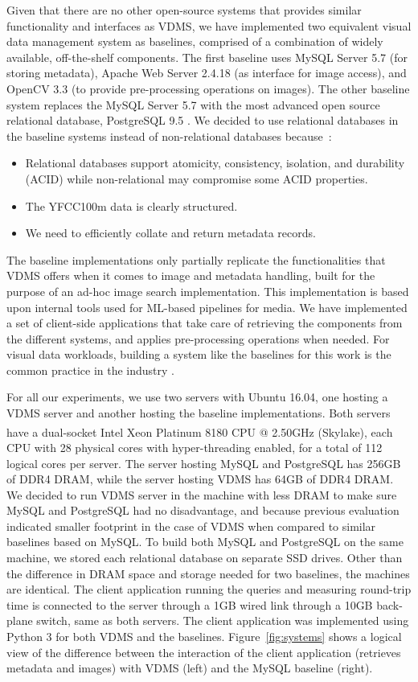Given that there are no other open-source systems
that provides similar functionality and interfaces as VDMS,
we have implemented two equivalent visual data management system as baselines,
comprised of a combination of widely available, off-the-shelf components.
The first baseline uses
MySQL Server 5.7 (for storing metadata),
Apache Web Server 2.4.18 (as interface for image access), and
OpenCV 3.3 (to provide pre-processing operations on images).
The other baseline system replaces the MySQL Server 5.7 with the
most advanced open source relational database, PostgreSQL 9.5 \cite{postgresql}.
We decided to use relational databases in the baseline systems instead of non-relational
databases because~\cite{Jatana2012, li_2019}:
\begin{itemize}
    \item Relational databases support atomicity, consistency, isolation,
    and durability (ACID) while non-relational may compromise some ACID properties.
    \item The YFCC100m data is clearly structured.
    \item We need to efficiently collate and return metadata records.
\end{itemize}
The baseline implementations only partially replicate the functionalities
that VDMS offers when it comes to image and metadata handling, built for the
purpose of an ad-hoc image search implementation.
This implementation is based upon internal tools used for
ML-based pipelines for media.
We have implemented a set of client-side applications that take care
of retrieving the components from the different systems, and applies
pre-processing operations when needed.
For visual data workloads, building a system like the baselines for this work
is the common practice in the industry \cite{haystack, tao}.

For all our experiments, we use two servers with Ubuntu 16.04, one hosting a VDMS server and
another hosting the baseline implementations.
Both servers have a dual-socket Intel\textsuperscript{\textregistered}
Xeon\textsuperscript{\textregistered} Platinum 8180 CPU @ 2.50GHz (Skylake),
each CPU with 28 physical cores with hyper-threading enabled,
for a total of 112 logical cores per server.
The server hosting MySQL and PostgreSQL has 256GB of DDR4 DRAM, while the server hosting VDMS
has 64GB of DDR4 DRAM.
We decided to run VDMS server in the machine with less DRAM to make
sure MySQL and PostgreSQL had no disadvantage, and because previous evaluation
indicated smaller footprint in the case of VDMS when
compared to similar baselines based on MySQL.
To build both MySQL and PostgreSQL on the same machine,
we stored each relational database on separate SSD drives.
Other than the difference in DRAM space and storage needed for two baselines, the machines are identical.
The client application running the queries and measuring round-trip time
is connected to the server through a 1GB wired link through
a 10GB back-plane switch, same as both servers.
The client application was implemented using Python 3 for both VDMS and the baselines.
Figure~\ref{fig:systems} shows a logical view of the difference between the
interaction of the client application (retrieves metadata and
images) with VDMS (left) and the MySQL baseline (right).


